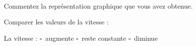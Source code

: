 \documentclass[11pt,a4paper]{article}
\newcommand{\cadreblanc}[1]{%
\medskip\framebox[\linewidth][c]{%
\rule{0mm}{#1mm}}\par
\medskip}
\begin{document}
 \\[5mm]
 Commentez la représentation graphique que vous avez obtenue. \\



\cadreblanc{25}

\vspace{1cm}

 Comparer les valeurs de la vitesse : 
\vspace{3mm}
\dotfill

\vspace{1cm}

 La vitesse : \hspace{5mm} $\square$~augmente \hspace{3cm} $\square$~reste constante\hspace{3cm} $\square$~diminue


\vfill 
\end{document}
